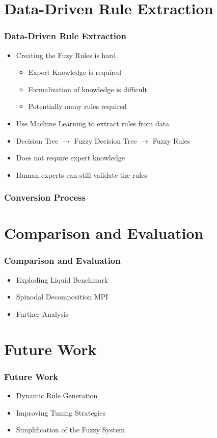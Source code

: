 \documentclass[
	10pt,
	t		%
]{beamer}
\begin{document}
\section{Data-Driven Rule Extraction}
\begin{frame}
	\frametitle{Data-Driven Rule Extraction}
	\begin{itemize}
		\item Creating the Fuzy Rules is hard
		      \begin{itemize}
			      \item Expert Knowledge is required
			      \item Formalization of knowledge is difficult
			      \item Potentially many rules required
		      \end{itemize}
		\item Use Machine Learning to extract rules from data
		\item Decision Tree $\rightarrow$ Fuzzy Decision Tree $\rightarrow$ Fuzzy Rules {\footnotesize \cite{CROCKETT20062809}}
		\item Does not require expert knowledge
		\item Human experts can still validate the rules
	\end{itemize}
\end{frame}

\begin{frame}
	\frametitle{Conversion Process}

\end{frame}

\section{Comparison and Evaluation}
\begin{frame}
	\frametitle{Comparison and Evaluation}
	\begin{itemize}
		\item Exploding Liquid Benchmark
		\item Spinodal Decomposition MPI
		\item Further Analysis
	\end{itemize}
\end{frame}

\section{Future Work}
\begin{frame}
	\frametitle{Future Work}
	\begin{itemize}
		\item Dynamic Rule Generation
		\item Improving Tuning Strategies
		\item Simplification of the Fuzzy System
	\end{itemize}
\end{frame}
\end{document}
